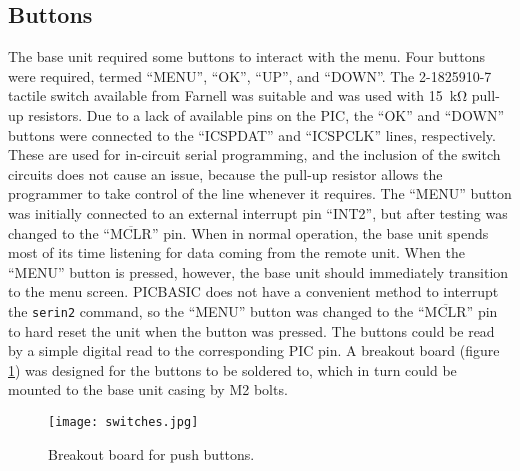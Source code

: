 \subsection{Buttons}
The base unit required some buttons to interact with the menu. Four buttons were required, termed ``MENU'', ``OK'', ``UP'', and ``DOWN''. The 2-1825910-7 tactile switch \cite{buttons} available from Farnell was suitable and was used with \SI{15}{\kilo\ohm} pull-up resistors. Due to a lack of available pins on the PIC, the ``OK'' and ``DOWN'' buttons were connected to the ``ICSPDAT'' and ``ICSPCLK'' lines, respectively. These are used for in-circuit serial programming, and the inclusion of the switch circuits does not cause an issue, because the pull-up resistor allows the programmer to take control of the line whenever it requires. The ``MENU'' button was initially connected to an external interrupt pin ``INT2'', but after testing was changed to the ``$\overline{\text{MCLR}}$'' pin. When in normal operation, the base unit spends most of its time listening for data coming from the remote unit. When the ``MENU'' button is pressed, however, the base unit should immediately transition to the menu screen. PICBASIC does not have a convenient method to interrupt the \verb|serin2| command, so the ``MENU'' button was changed to the ``$\overline{\text{MCLR}}$'' pin to hard reset the unit when the button was pressed. The buttons could be read by a simple digital read to the corresponding PIC pin. A breakout board (figure \ref{fig: buttons}) was designed for the buttons to be soldered to, which in turn could be mounted to the base unit casing by M2 bolts.

\begin{figure}[htb]
	\centering
	\texttt{[image: switches.jpg]}
	\caption{Breakout board for push buttons.}
	\label{fig: buttons}
	\vspace{-8mm}
\end{figure}